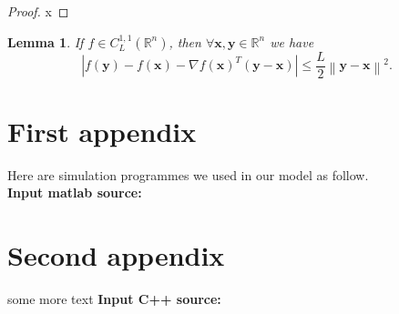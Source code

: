 \documentclass{mcmthesis}
\begin{document}
\begin{appendices}
\begin{proof}   %
  x
\end{proof}

\newtheorem{lemma}{Lemma}%
\begin{lemma}  
If $f\in C_{L}^{1,1}(\mathbb{R}^{n})$, then $\forall \textbf{x},\textbf{y}\in\mathbb{R}^{n}$ we have  
\begin{equation}  
\left|{f(\textbf{y})-f(\textbf{x})-\nabla f(\textbf{x})^{T}(\textbf{y}-\textbf{x})}\right|\le\frac{L}{2}\left\|{\textbf{y}-\textbf{x}}\right\|^{2}.  
\end{equation}  
\end{lemma} 
\section{First appendix}

\lipsum[13]

Here are simulation programmes we used in our model as follow.\\

\textbf{\textcolor[rgb]{0.98,0.00,0.00}{Input matlab source:}}


\section{Second appendix}

some more text \textcolor[rgb]{0.98,0.00,0.00}{\textbf{Input C++ source:}}


\end{appendices}
\end{document}
